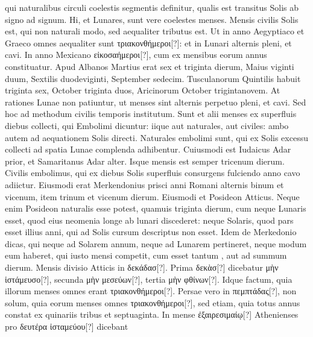 qui naturalibus circuli coelestis segmentis definitur, qualis est transitus
Solis ab signo ad signum.
Hi, et Lunares, sunt vere coelestes menses.
Mensis civilis Solis est, qui non naturali modo,
 sed aequaliter tributus
est.
Ut in anno Aegyptiaco et Graeco omnes aequaliter sunt
 \textgreek{τριακονθήμεροι[?]}:
et in Lunari alternis pleni, et cavi.
In anno Mexicano \textgreek{εἰκοσαήμεροι[?]},
cum ex  mensibus eorum annus constituatur.
Apud Albanos
Martius erat sex et triginta dierum, Maius viginti duum, Sextilis
duodeviginti, September sedecim.
Tusculanorum Quintilis habuit
triginta sex, October triginta duos, Aricinorum October trigintanovem.
At rationes Lunae non patiuntur, ut menses sint alternis
perpetuo pleni, et cavi.
Sed hoc ad methodum civilis temporis institutum.
Sunt et alii menses ex superfluis diebus collecti, qui Embolimi
dicuntur: iique aut naturales, aut civiles: ambo autem ad aequationem
Solis directi.
Naturales embolimi sunt, qui ex Solis excessu collecti
ad spatia Lunae complenda adhibentur.
Cuiusmodi est Iudaicus
Adar prior, et Samaritanus Adar alter.
Isque mensis est semper tricenum dierum.
Civilis embolimus, qui ex diebus Solis superfluis consurgens
fulciendo anno cavo adiictur.
Eiusmodi erat Merkendonius
prisci anni Romani alternis binum et vicenum, item trinum et vicenum
dierum.
%
Eiusmodi et Posideon Atticus.
Neque enim Posideon
naturalis esse potest, quamuis triginta dierum, cum neque Lunaris
esset, quod eius neomenia longe ab lunari discederet: neque Solaris,
quod pars esset illius anni, qui ad Solis cursum descriptus non esset.
Idem de Merkedonio dicas, qui neque ad Solarem annum, neque ad
Lunarem pertineret, neque modum eum haberet, qui iusto mensi
competit, cum esset tantum , aut ad summum  dierum.
Mensis divisio Atticis in \textgreek{δεκάδασ[?]}.
Prima \textgreek{δεκὰσ[?]} dicebatur \textgreek{μὴν ἱστάμευσο[?]},
secunda \textgreek{μὴν μεσεύων[?]}, tertia \textgreek{μὴν φθίνων[?]}.
Idque factum, quia
illorum menses omnes erant \textgreek{τριακονθήμεροι[?]}.
Persae vero in \textgreek{πεμπτάδας[?]},
non solum, quia eorum menses omnes \textgreek{τριακονθήμεροι[?]},
 sed etiam, quia
totus annus constat ex quinariis tribus et septuaginta.
In mense \textgreek{ἐξαιρεσιμαίῳ[?]}
Athenienses pro \textgreek{δευτέρα ἱσταμεύου[?]} dicebant
